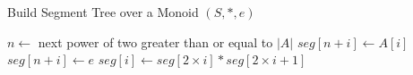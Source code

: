 \begin{algorithm}
    \caption{Build Segment Tree over a Monoid \((S, \ast, e)\)}
    \begin{algorithmic}[1]
            \State $n \gets$ next power of two greater than or equal to $|A|$
                \State $seg[n + i] \gets A[i]$ 
            \EndFor
                \State $seg[n + i] \gets e$ 
            \EndFor
                \State $seg[i] \gets seg[2 \times i] \ast seg[2 \times i + 1]$
            \EndFor
        \EndProcedure
    \end{algorithmic}
\end{algorithm}
